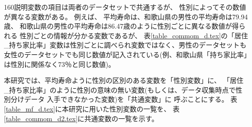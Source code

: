 160説明変数の項目は両者のデータセットで共通するが、
性別によってその数値が異なる変数がある。
例えば、
平均寿命は、和歌山県の男性の平均寿命は79.94歳、
和歌山県の男性の平均寿命は86.47歳のように性別ごとに異なる数値が得られる
性別ごとの情報が分かる変数であるが、
表\ref{table_commom_d.tex}の「居住\_持ち家比率」変数は性別ごとに調べられ変数ではなく、男性のデータセットも女性のデータセットでも同じ数値が記入されている(例、和歌山県「持ち家比率」は性別に関係なく73％と同じ数値)。

%


本研究では、平均寿命ように性別の区別のある変数を「性別変数」に、
「居住\_持ち家比率」のように性別の意味の無い変数(もしくは、データ収集時点で性別分けデータ
入手できなかった変数)を「共通変数」に
呼ぶことにする。
表\ref{table_mf_d.tex}に本研究に用いた性別変数の一覧を、
表\ref{table_commom_d2.tex}に共通変数の一覧を示す。



%



\begin{landscape}
\end{landscape}






%
%
%
%
%

%
%



%

